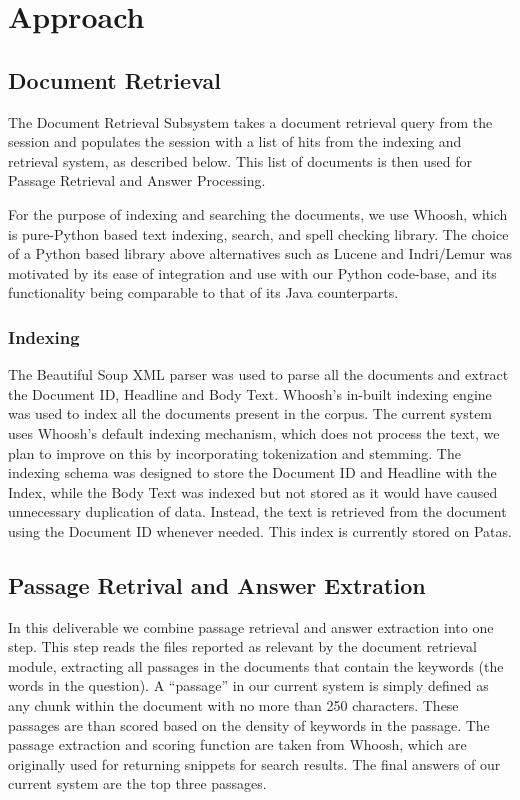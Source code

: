 \documentclass[11pt]{article}
\begin{document}
\section{Approach}
\subsection{Document Retrieval}
The Document Retrieval Subsystem takes a document retrieval query from the session and populates the session with a list of hits from the indexing and retrieval system, as described below. This list of documents is then used for Passage Retrieval and Answer Processing.

For the purpose of indexing and searching the documents, we use Whoosh\cite{whoosh}, which is pure-Python based text indexing, search, and spell checking library. The choice of a Python based library above alternatives such as Lucene and Indri/Lemur was motivated by its ease of integration and use with our Python code-base, and its functionality being comparable to that of its Java counterparts. 

\subsubsection{Indexing}
The Beautiful Soup XML parser\cite{bsoup} was used to parse all the documents and extract the Document ID, Headline and Body Text. Whoosh's in-built indexing engine was used to index all the documents present in the corpus. The current system uses Whoosh's default indexing mechanism, which does not process the text, we plan to improve on this by incorporating tokenization and stemming. The indexing schema was designed to store the Document ID and Headline with the Index, while the Body Text was indexed but not stored as it would have caused unnecessary duplication of data. Instead, the text is retrieved from the document using the Document ID whenever needed. This index is currently stored on Patas.

\subsection{Passage Retrival and Answer Extration}
In this deliverable we combine passage retrieval and answer extraction into one step. This step reads the files reported as relevant by the document retrieval module, extracting all passages in the documents that contain the keywords (the words in the question). A ``passage'' in our current system is simply defined as any chunk within the document with no more than 250 characters. These passages are than scored based on the density of keywords in the passage. The passage extraction and scoring function are taken from Whoosh, which are originally used for returning snippets for search results. The final answers of our current system are the top three passages.
\end{document}

